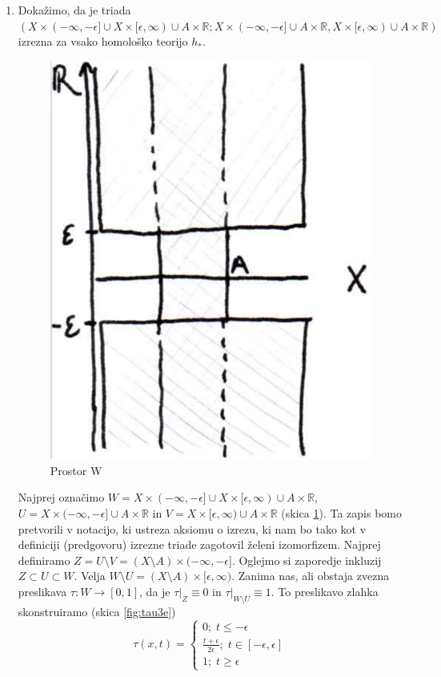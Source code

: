 \documentclass[a4paper, 12pt]{article}
\newcommand{\R}{\mathbb{R}}
\begin{document}
\begin{enumerate}[label=(\alph*)]
	\item Dokažimo, da je triada $(X \times (-\infty, -\epsilon] \cup X \times [\epsilon, \infty) \cup A \times \R;  X \times (-\infty, -\epsilon] \cup A\times \R, X \times [\epsilon, \infty) \cup A \times \R)$ izrezna za vsako homološko teorijo $h_*$.
	
	\begin{figure}[h]
		\centering
		\includegraphics[scale=0.3]{produkt3e.png}
		\caption{Prostor W}
		\label{fig:prW}
	\end{figure}
	
	Najprej označimo $W = X \times (-\infty, -\epsilon] \cup X \times [\epsilon, \infty) \cup A \times \R$, $U = X \times (-\infty, -\epsilon] \cup A\times \R$ in $V = X \times [\epsilon, \infty) \cup A \times \R$ (skica \ref{fig:prW}). Ta zapis bomo pretvorili v notacijo, ki ustreza aksiomu o izrezu, ki nam bo tako kot v definiciji (predgovoru) izrezne triade zagotovil želeni izomorfizem. Najprej definiramo $Z = U \setminus V = (X \setminus A) \times (-\infty, -\epsilon]$. Oglejmo si zaporedje inkluzij $Z \subset U \subset W$. Velja $W \setminus U = (X \setminus A) \times [\epsilon, \infty)$. Zanima nas, ali obstaja zvezna preslikava $\tau\colon W \to [0, 1]$, da je $\tau|_Z \equiv 0$ in $\tau|_{W\setminus U} \equiv 1$. To preslikavo zlahka skonstruiramo (skica \ref{fig:tau3e})
	\[
	\tau(x, t) = \begin{cases}
	0 ; \; t \leq -\epsilon \\
	\frac{t + \epsilon}{2\epsilon} ; \; t \in [-\epsilon, \epsilon]\\
	1 ; \; t \geq \epsilon
	\end{cases}
	\]
	

\end{enumerate}
\end{document}
